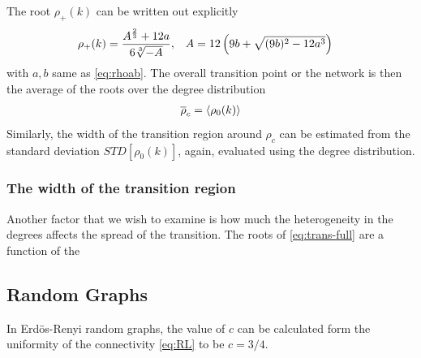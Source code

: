 \documentclass[linenumbers,endfloats,nofootinbib,preprint,floatfix,titlepage,superscriptaddress]{revtex4-1} %
\newcommand{\outNim}[1]{}
\begin{document}
The root $\rho_+(k)$ can be written out explicitly
\begin{align}
    \rho_+(k) %
    &=\frac{A^{\frac{2}{3}} + 12 a}{6 \sqrt[3]{- A}}, &
    A& = 12 \pr{9 b + \sqrt{(9b)^{2}- 12 a^{3} }}
    \label{eq:trans-rc-full}
\end{align}
with $a,b$ same as \eqref{eq:rhoab}. 
The overall transition point or the network is then the average of the roots over the degree distribution
\begin{align}
    \overline{\rho}_c = \left<\rho_0(k)\right>
\end{align}
Similarly, the width of the transition region around $\rho_c$ can be estimated from the standard deviation $STD[\rho_0(k)]$, again, evaluated using the degree distribution.



\subsubsection{The width of the transition region}
Another factor that we wish to examine is how much the heterogeneity in the degrees affects the spread of the transition. 
The roots of \eqref{eq:trans-full} are a function of the 




\subsection{Random Graphs}
In Erd\"os-Renyi random graphs, the value of $c$ can be calculated form the uniformity of the connectivity \eqref{eq:RL} to be $c=3/4$. 


\outNim{
\subsubsection{General Comparison of Conditions}
We wish to find out which of the following two conditions occurs at smaller $r_L/r_N$ ratio: 1) total node volume becomes comparable to leading term of link volumes; 2) link exclusion volume becomes considerable. 
}
\end{document}
